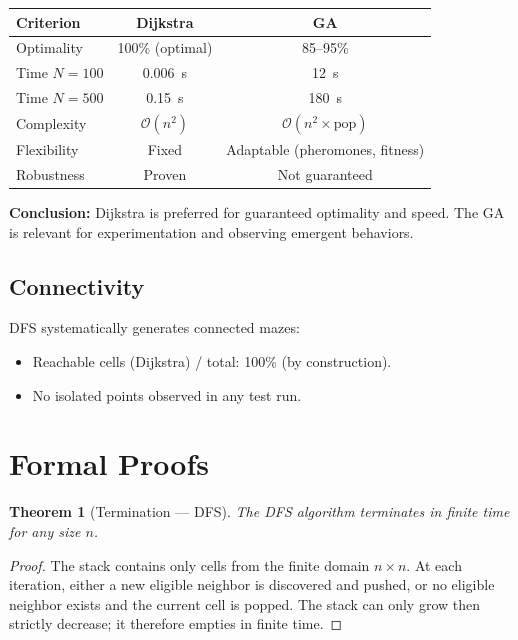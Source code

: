 \documentclass[12pt, a4paper]{article}
\newtheorem{theorem}{Theorem}[section]
\theoremstyle{definition}
\newcommand{\bigO}[1]{\mathcal{O}\!\left(#1\right)}
\begin{document}
\begin{center}
\begin{tabularx}{\textwidth}{lCC}
    \toprule
    Criterion & Dijkstra & GA \\
    \midrule
    Optimality     & 100\% (optimal) & 85--95\% \\
    Time $N=100$   & 0.006~s         & 12~s \\
    Time $N=500$   & 0.15~s          & 180~s \\
    Complexity     & $\bigO{n^2}$    & $\bigO{n^2 \times \text{pop}}$ \\
    Flexibility    & Fixed           & Adaptable (pheromones, fitness) \\
    Robustness     & Proven          & Not guaranteed \\
    \bottomrule
\end{tabularx}
\end{center}

\textbf{Conclusion:} Dijkstra is preferred for guaranteed optimality and speed.
The GA is relevant for experimentation and observing emergent behaviors.

\subsection{Connectivity}

DFS systematically generates connected mazes:
\begin{itemize}[noitemsep]
    \item Reachable cells (Dijkstra) / total: 100\% (by construction).
    \item No isolated points observed in any test run.
\end{itemize}

\section{Formal Proofs}

\begin{theorem}[Termination --- DFS]
The DFS algorithm terminates in finite time for any size $n$.
\end{theorem}

\begin{proof}
The stack contains only cells from the finite domain $n \times n$.
At each iteration, either a new eligible neighbor is discovered and pushed,
or no eligible neighbor exists and the current cell is popped.
The stack can only grow then strictly decrease; it therefore empties in finite time.
\end{proof}
\end{document}
